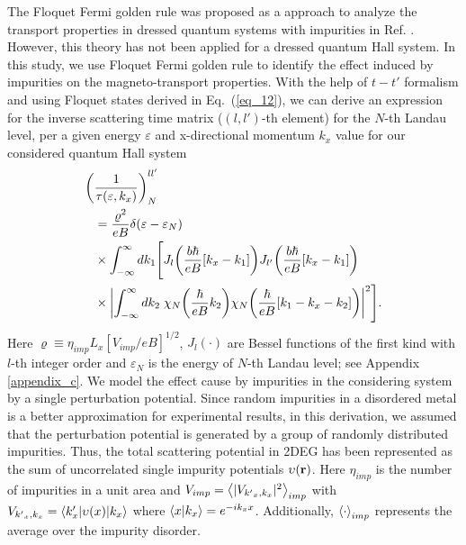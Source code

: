 
The Floquet Fermi golden rule was proposed as a approach to analyze the transport properties in dressed quantum systems with impurities in Ref. \cite{wackerl20}. However, this theory has not been applied for a dressed quantum Hall system. In this study, we use Floquet Fermi golden rule to identify the effect induced by impurities on the magneto-transport properties.
With the help of $t-t'$ formalism \cite{wackerl20,grifoni98,sambe75,peskin93,althorpe97} and using Floquet states derived in Eq.~(\ref{eq_12}), we can derive an  expression for the inverse scattering time matrix ($(l,l')$-th element) for the $N$-th Landau level, per a given energy $\varepsilon$ and x-directional momentum $k_x$ value for our considered quantum Hall system
\begin{equation} \label{eq_13}
  \begin{aligned}
    \bigg(&\frac{1}{\tau(\varepsilon,k_x)}\bigg)^{ll'}_{N} \\
    & =
    \frac { \varrho^2}{eB}
    \delta(\varepsilon - \varepsilon_{N}) \\
    & \times
    \int_{-\infty}^{\infty} d k_1 \Bigg[
    J_l\qty(\frac{b\hbar}{eB}[{k}_x - k_1])
    J_{l'}\qty(\frac{b\hbar}{eB}[{k}_x - k_1]) \\
    & \times
    \qty|
    \int_{-\infty}^{\infty} dk_2 \;
    {\chi}_{N}\qty(\frac{\hbar}{eB}k_2)
    {\chi}_{N}\qty(\frac{\hbar}{eB} \qty[k_1 - {k}_x - k_2])|^2\Bigg].
  \end{aligned}
\end{equation}
Here $\varrho \equiv \eta_{imp} L_x [ { V_{imp}}/{eB}]^{1/2}$,
$J_l(\cdot)$ are Bessel functions of the first kind with $l$-th integer order and $\varepsilon_N$ is the energy of $N$-th Landau level; see Appendix \ref{appendix_c}. We model the effect cause by impurities in the considering system by a single perturbation potential.
Since random impurities in a disordered metal is a better approximation for experimental results, in this derivation, we assumed that the perturbation potential is generated by a group of randomly distributed impurities.
Thus, the total scattering potential in 2DEG has been represented as the sum of uncorrelated single impurity potentials $\upsilon(\vb{r})$. Here $\eta_{imp}$ is the number of impurities in a unit area and $V_{imp} = \expval{|V_{{k'}_x,k_x}|^2}_{imp}$ with $V_{{k'}_x,k_x} = \mel**{k'_x}{\upsilon(x) }{k_x}$ where $\braket{x}{k_x} = e^{-ik_x x}$.
Additionally, $\expval{\cdot}_{imp}$ represents the average over the impurity disorder.

